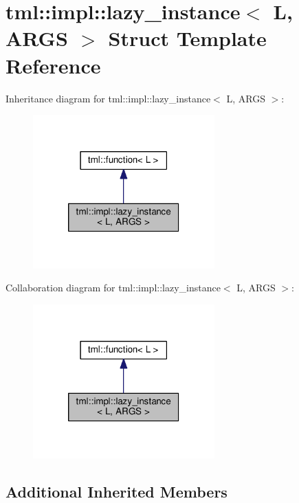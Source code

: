 \hypertarget{structtml_1_1impl_1_1lazy__instance}{\section{tml\+:\+:impl\+:\+:lazy\+\_\+instance$<$ L, A\+R\+G\+S $>$ Struct Template Reference}
\label{structtml_1_1impl_1_1lazy__instance}
}


Inheritance diagram for tml\+:\+:impl\+:\+:lazy\+\_\+instance$<$ L, A\+R\+G\+S $>$\+:
\nopagebreak
\begin{figure}[H]
\begin{center}
\leavevmode
\includegraphics[width=198pt]{structtml_1_1impl_1_1lazy__instance__inherit__graph}
\end{center}
\end{figure}


Collaboration diagram for tml\+:\+:impl\+:\+:lazy\+\_\+instance$<$ L, A\+R\+G\+S $>$\+:
\nopagebreak
\begin{figure}[H]
\begin{center}
\leavevmode
\includegraphics[width=198pt]{structtml_1_1impl_1_1lazy__instance__coll__graph}
\end{center}
\end{figure}
\subsection*{Additional Inherited Members}


